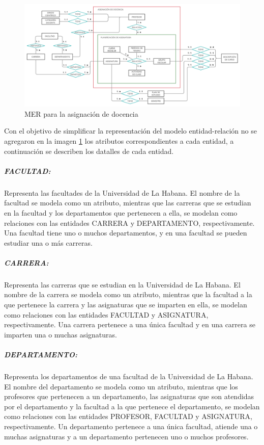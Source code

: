 \begin{figure}[H]
    \includegraphics[scale=0.31]{Graphics/Database/MERXX-TA-FINAL.png}
    \caption{MER para la asignación de docencia}
    \label{merxx-docencia}
    
\end{figure}


Con el objetivo de simplificar la representación del modelo entidad-relación
no se agregaron en la imagen \ref{merxx-docencia} los atributos correspondientes a cada entidad,
a continuación se describen los datalles de cada entidad.


\subparagraph{FACULTAD:}
Representa las facultades de la Universidad de La Habana.
El nombre de la facultad se modela como un atributo, mientras que 
las carreras que se estudian en la facultad y los departamentos que pertenecen 
a ella, se modelan como relaciones con las entidades CARRERA y DEPARTAMENTO, respectivamente.
Una facultad tiene uno o muchos departamentos, y en 
una facultad se pueden estudiar una o más carreras.

\subparagraph{CARRERA:}
Representa las carreras que se estudian en la Universidad de La Habana.
El nombre de la carrera se modela como un atributo, mientras que la facultad a la que pertenece la carrera y
las asignaturas que se imparten en ella, se modelan como relaciones con las entidades FACULTAD y
ASIGNATURA, respectivamente. 
Una carrera pertenece a una única facultad y en una carrera se imparten una o muchas asignaturas.

\subparagraph{DEPARTAMENTO:}
Representa los departamentos de una facultad de la Universidad de La Habana.
El nombre del departamento se modela como un atributo, mientras que los profesores que 
pertenecen a un departamento, las asignaturas que son atendidas por el departamento y la 
facultad a la que pertenece el departamento, se modelan como relaciones con las entidades 
PROFESOR, FACULTAD y ASIGNATURA, respectivamente. Un departamento pertenece a una única facultad,
atiende una o muchas asignaturas y a un departamento pertenecen uno o muchos 
profesores.

